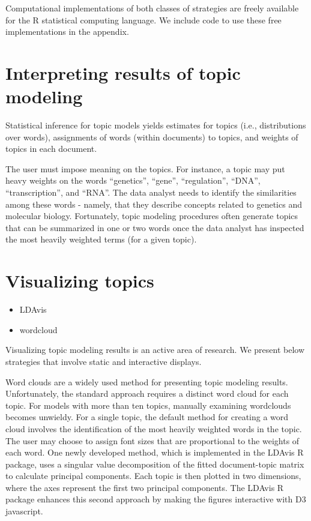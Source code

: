 \documentclass[12pt,]{article}
\providecommand{\tightlist}{%
  \setlength{\itemsep}{0pt}\setlength{\parskip}{0pt}}
\begin{document}
Computational implementations of both classes of strategies are freely
available for the R statistical computing language. We include code to
use these free implementations in the appendix.

\section{Interpreting results of topic
modeling}\label{interpreting-results-of-topic-modeling}

Statistical inference for topic models yields estimates for topics
(i.e., distributions over words), assignments of words (within
documents) to topics, and weights of topics in each document.

The user must impose meaning on the topics. For instance, a topic may
put heavy weights on the words ``genetics'', ``gene'', ``regulation'',
``DNA'', ``transcription'', and ``RNA''. The data analyst needs to
identify the similarities among these words - namely, that they describe
concepts related to genetics and molecular biology. Fortunately, topic
modeling procedures often generate topics that can be summarized in one
or two words once the data analyst has inspected the most heavily
weighted terms (for a given topic).

\section{Visualizing topics}\label{visualizing-topics}

\begin{itemize}
\tightlist
\item
  LDAvis
\item
  wordcloud
\end{itemize}

Visualizing topic modeling results is an active area of research. We
present below strategies that involve static and interactive displays.

Word clouds are a widely used method for presenting topic modeling
results. Unfortunately, the standard approach requires a distinct word
cloud for each topic. For models with more than ten topics, manually
examining wordclouds becomes unwieldy. For a single topic, the default
method for creating a word cloud involves the identification of the most
heavily weighted words in the topic. The user may choose to assign font
sizes that are proportional to the weights of each word. One newly
developed method, which is implemented in the LDAvis R package, uses a
singular value decomposition of the fitted document-topic matrix to
calculate principal components. Each topic is then plotted in two
dimensions, where the axes represent the first two principal components.
The LDAvis R package enhances this second approach by making the figures
interactive with D3 javascript.
\end{document}
